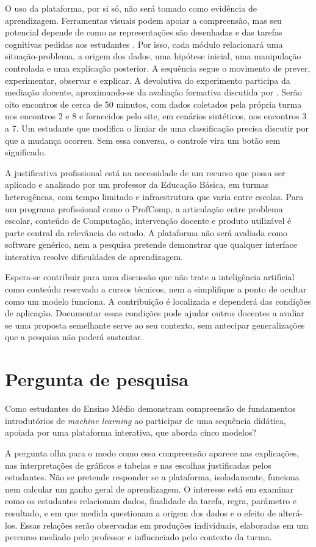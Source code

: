 O uso da plataforma, por si só, não será tomado como evidência de aprendizagem. Ferramentas visuais podem apoiar a compreensão, mas seu potencial depende de como as representações são desenhadas e das tarefas cognitivas pedidas aos estudantes \cite{ainsworth2006deft}. Por isso, cada módulo relacionará uma situação-problema, a origem dos dados, uma hipótese inicial, uma manipulação controlada e uma explicação posterior. A sequência segue o movimento de prever, experimentar, observar e explicar. A devolutiva do experimento participa da mediação docente, aproximando-se da avaliação formativa discutida por . Serão oito encontros de cerca de 50 minutos, com dados coletados pela própria turma nos encontros 2 e 8 e fornecidos pelo site, em cenários sintéticos, nos encontros 3 a 7. Um estudante que modifica o limiar de uma classificação precisa discutir por que a mudança ocorreu. Sem essa conversa, o controle vira um botão sem significado.

A justificativa profissional está na necessidade de um recurso que possa ser aplicado e analisado por um professor da Educação Básica, em turmas heterogêneas, com tempo limitado e infraestrutura que varia entre escolas. Para um programa profissional como o ProfComp, a articulação entre problema escolar, conteúdo de Computação, intervenção docente e produto utilizável é parte central da relevância do estudo. A plataforma não será avaliada como software genérico, nem a pesquisa pretende demonstrar que qualquer interface interativa resolve dificuldades de aprendizagem.

Espera-se contribuir para uma discussão que não trate a inteligência artificial como conteúdo reservado a cursos técnicos, nem a simplifique a ponto de ocultar como um modelo funciona. A contribuição é localizada e dependerá das condições de aplicação. Documentar essas condições pode ajudar outros docentes a avaliar se uma proposta semelhante serve ao seu contexto, sem antecipar generalizações que a pesquisa não poderá sustentar.

\section{Pergunta de pesquisa}

Como estudantes do Ensino Médio demonstram compreensão de fundamentos introdutórios de \textit{machine learning} ao participar de uma sequência didática, apoiada por uma plataforma interativa, que aborda cinco modelos?

A pergunta olha para o modo como essa compreensão aparece nas explicações, nas interpretações de gráficos e tabelas e nas escolhas justificadas pelos estudantes. Não se pretende responder se a plataforma, isoladamente, funciona nem calcular um ganho geral de aprendizagem. O interesse está em examinar como os estudantes relacionam dados, finalidade da tarefa, regra, parâmetro e resultado, e em que medida questionam a origem dos dados e o efeito de alterá-los. Essas relações serão observadas em produções individuais, elaboradas em um percurso mediado pelo professor e influenciado pelo contexto da turma.
